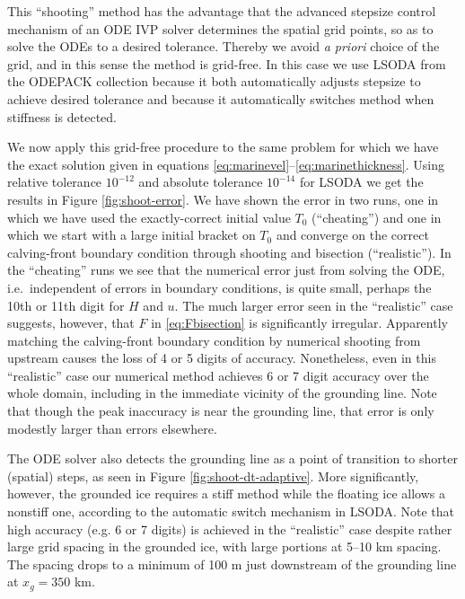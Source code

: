 \documentclass[twocolumn]{igs}
\begin{document}
This ``shooting'' method has the advantage that the advanced stepsize control mechanism of an ODE IVP solver determines the spatial grid points, so as to solve the ODEs to a desired tolerance.  Thereby we avoid \emph{a priori} choice of the grid, and in this sense the method is grid-free.  In this case we use LSODA from the ODEPACK collection \citep{Hindmarsh1983ODEPACK} because it both automatically adjusts stepsize to achieve desired tolerance and because it automatically switches method when stiffness \citep[section 16.6]{Pressetal} is detected.

We now apply this grid-free procedure to the same problem for which we have the exact solution given in equations \eqref{eq:marinevel}--\eqref{eq:marinethickness}.  Using relative tolerance $10^{-12}$ and absolute tolerance $10^{-14}$ for LSODA we get the results in Figure \ref{fig:shoot-error}.  We have shown the error in two runs, one in which we have used the exactly-correct initial value $T_0$ (``cheating'') and one in which we start with a large initial bracket on $T_0$ and converge on the correct calving-front boundary condition through shooting and bisection (``realistic'').  In the ``cheating'' runs we see that the numerical error just from solving the ODE, i.e.~independent of errors in boundary conditions, is quite small, perhaps the 10th or 11th digit for $H$ and $u$.  The much larger error seen in the ``realistic'' case suggests, however, that $F$ in \eqref{eq:Fbisection} is significantly irregular.  Apparently matching the calving-front boundary condition by numerical shooting from upstream causes the loss of 4 or 5 digits of accuracy.  Nonetheless, even in this ``realistic'' case our numerical method achieves 6 or 7 digit accuracy over the whole domain, including in the immediate vicinity of the grounding line.  Note that though the peak inaccuracy is near the grounding line, that error is only modestly larger than errors elsewhere.

The ODE solver also detects the grounding line as a point of transition to shorter (spatial) steps, as seen in Figure \ref{fig:shoot-dt-adaptive}.  More significantly, however, the grounded ice requires a stiff method while the floating ice allows a nonstiff one, according to the automatic switch mechanism in LSODA.  Note that high accuracy (e.g. 6 or 7 digits) is achieved in the ``realistic'' case despite rather large grid spacing in the grounded ice, with large portions at 5--10 km spacing.  The spacing drops to a minimum of 100 m just downstream of the grounding line at $x_g=350$ km.
\end{document}
